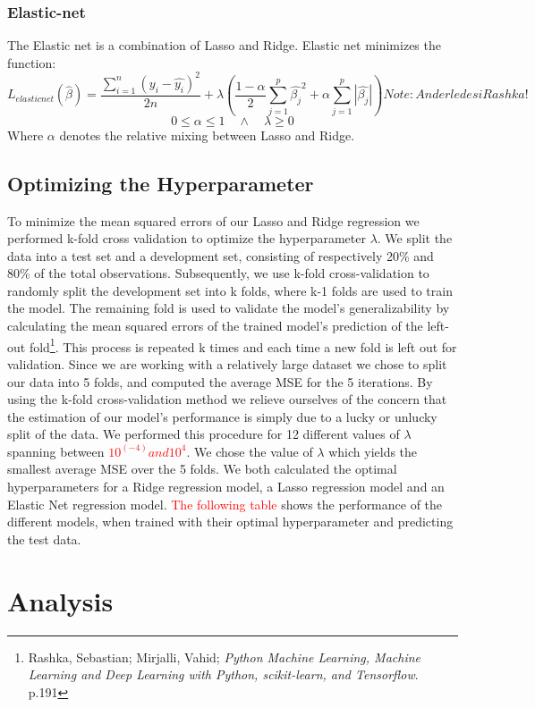 \documentclass[12pt,a4paper]{article}
\begin{document}
\subsubsection{Elastic-net}
The Elastic net is a combination of Lasso and Ridge. Elastic net minimizes the function: 
$$L_{elasticnet}(\hat{\beta}) = \frac{\sum_{i=1}^{n}\left(y_i-\hat{y_i}\right)^2}{2n} + \lambda\left(\frac{1-\alpha}{2}\sum_{j=1}^{p}\hat{\beta_j}^2+\alpha\sum_{j=1}^{p}|\hat{\beta_j}|\right) Note: Anderledes i Rashka!$$
$$0 \leq \alpha \leq 1 \quad \wedge \quad \lambda \geq 0$$
Where $\alpha$ denotes the relative mixing between Lasso and Ridge. 
\subsection{Optimizing the Hyperparameter}
To minimize the mean squared errors of our Lasso and Ridge regression we performed k-fold cross validation to optimize the hyperparameter $\lambda$. 
We split the data into a test set and a development set, consisting of respectively 20\% and 80\% of the total observations. Subsequently, we use k-fold cross-validation to randomly split the development set into k folds, where k-1 folds are used to train the model. The remaining fold is used to validate the model’s generalizability by calculating the mean squared errors of the trained model’s prediction of the left-out fold\footnote{Rashka, Sebastian; Mirjalli, Vahid; \textit{Python Machine Learning, Machine Learning and Deep Learning with Python, scikit-learn, and Tensorflow}. p.191}. This process is repeated k times and each time a new fold is left out for validation. Since we are working with a relatively large dataset we chose to split our data into 5 folds, and computed the average MSE for the 5 iterations. By using the k-fold cross-validation method we relieve ourselves of the concern that the estimation of our model’s performance is simply due to a lucky or unlucky split of the data. \newline
We performed this procedure for 12 different values of $\lambda$ spanning between \textcolor{red}{$10^(-4) and 10^4$}. We chose the value of $\lambda$ which yields the smallest average MSE over the 5 folds. 
We both calculated the optimal hyperparameters for a Ridge regression model, a Lasso regression model and an Elastic Net regression model. \textcolor{red}{The following table} shows the performance of the different models, when trained with their optimal hyperparameter and predicting the test data.

\section{Analysis}
\end{document}
